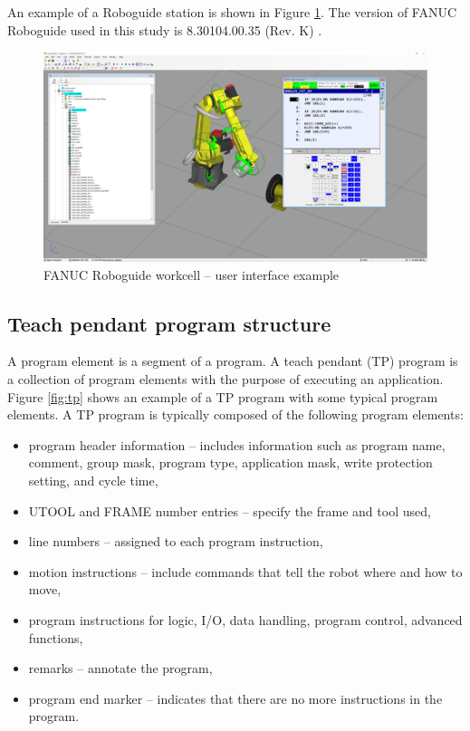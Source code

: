 An example of a Roboguide station is shown in Figure \ref{fig:roboguide}. The version of FANUC Roboguide used in this study is 8.30104.00.35 (Rev. K) \cite{roboguide}. 

\begin{figure}[h]
    \centering
    \includegraphics[width=0.9\linewidth]{img/roboguide.PNG}
    \caption{FANUC Roboguide workcell -- user interface example}
    \label{fig:roboguide}
\end{figure}

\subsection{Teach pendant program structure}

A program element is a segment of a program. A teach pendant (TP) program is a collection of program elements with the purpose of executing an application.  Figure \ref{fig:tp} shows an example of a TP program with some typical program elements. A TP program is typically composed of the following program elements:

\begin{itemize}

\item program header information -- includes information such as program name, comment, group mask, program type, application mask, write protection setting, and cycle time, 
\item UTOOL and FRAME number entries -- specify the frame and tool used,
\item line numbers -- assigned to each program instruction,
\item motion instructions -- include commands that tell the robot where and how to move,
\item program instructions for logic, I/O, data handling, program control, advanced functions,
\item remarks -- annotate the program,
\item program end marker -- indicates that there are no more instructions in the program.

\end{itemize}

